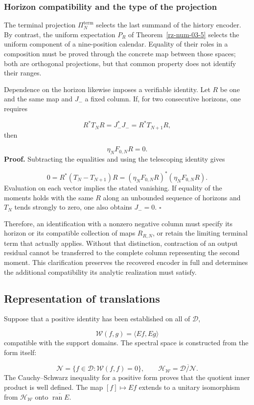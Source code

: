 \subsubsection*{Horizon compatibility and the type of the projection}
The terminal projection \(\Pi_N^{\mathrm{term}}\) selects the last summand of the history encoder. By contrast, the uniform expectation \(P_R\) of Theorem~\ref{rz-num-03-5} selects the uniform component of a nine-position calendar. Equality of their roles in a composition must be proved through the concrete map between those spaces; both are orthogonal projections, but that common property does not identify their ranges.

Dependence on the horizon likewise imposes a verifiable identity. Let \(R\) be one and the same map and \(J_-\) a fixed column. If, for two consecutive horizons, one requires

\[
R^*T_NR=J_-^*J_-=R^*T_{N+1}R,
\]
then

\[
\eta_NF_{0,N}R=0.
\]
\textbf{Proof.} Subtracting the equalities and using the telescoping identity gives

\[
0=R^*(T_N-T_{N+1})R
=(\eta_NF_{0,N}R)^*(\eta_NF_{0,N}R).
\]
Evaluation on each vector implies the stated vanishing. If equality of the moments holds with the same \(R\) along an unbounded sequence of horizons and \(T_N\) tends strongly to zero, one also obtains \(J_-=0\). \hfill\(\square\)

Therefore, an identification with a nonzero negative column must specify its horizon or its compatible collection of maps \(R_{R,N}\), or retain the limiting terminal term that actually applies. Without that distinction, contraction of an output residual cannot be transferred to the complete column representing the second moment. This clarification preserves the recovered encoder in full and determines the additional compatibility its analytic realization must satisfy.

\subsection{Representation of translations}
\label{rz:traslaciones}
Suppose that a positive identity has been established on all of \(\mathcal D\),

\[
\mathscr W(f,g)=\langle Ef,Eg\rangle
\]
compatible with the support domains. The spectral space is constructed from the form itself:

\[
\mathcal N=\{f\in\mathcal D:\mathscr W(f,f)=0\},\qquad
\mathcal H_{\mathscr W}
=\overline{\mathcal D/\mathcal N}.
\]
The Cauchy–Schwarz inequality for a positive form proves that the quotient inner product is well defined. The map \([f]\mapsto Ef\) extends to a unitary isomorphism from \(\mathcal H_{\mathscr W}\) onto \(\overline{\operatorname{ran}E}\).

